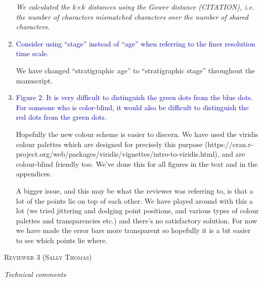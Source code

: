 \documentclass[12pt,letterpaper]{article}
\renewcommand{\section}[1]{%
\bigskip
\begin{center}
\begin{Large}
\normalfont\scshape #1
\medskip
\end{Large}
\end{center}}
\renewcommand{\subsection}[1]{%
\bigskip
\begin{center}
\begin{large}
\normalfont\itshape #1
\end{large}
\end{center}}
\begin{document}
\begin{enumerate}
\textit{We calculated the $k$$\times$$k$ distances using the Gower distance (CITATION), i.e. the number of characters mismatched characters over the number of shared characters.}

\item{\textcolor{blue}{Consider using ``stage'' instead of ``age'' when referring to the finer resolution time scale.}}

We have changed ``stratigraphic age'' to ``stratigraphic stage'' throughout the manuscript.

\item{\textcolor{blue}{Figure 2. It is very difficult to distinguish the green dots from the blue dots. For someone who is color-blind, it would also be difficult to distinguish the red dots from the green dots.}}

Hopefully the new colour scheme is easier to discern.
We have used the viridis colour palettes which are designed for precisely this purpose (https://cran.r-project.org/web/packages/viridis/vignettes/intro-to-viridis.html), and are colour-blind friendly too. We've done this for all figures in the text and in the appendices.

A bigger issue, and this may be what the reviewer was referring to, is that a lot of the points lie on top of each other. We have played around with this a lot (we tried jittering and dodging point positions, and various types of colour palettes and transparencies etc.) and there's no satisfactory solution. For now we have made the error bars more transparent so hopefully it is a bit easier to see which points lie where.


\end{enumerate}


%
%

\section{Reviewer 3 (Sally Thomas)}
\subsection{Technical comments}
\end{document}

